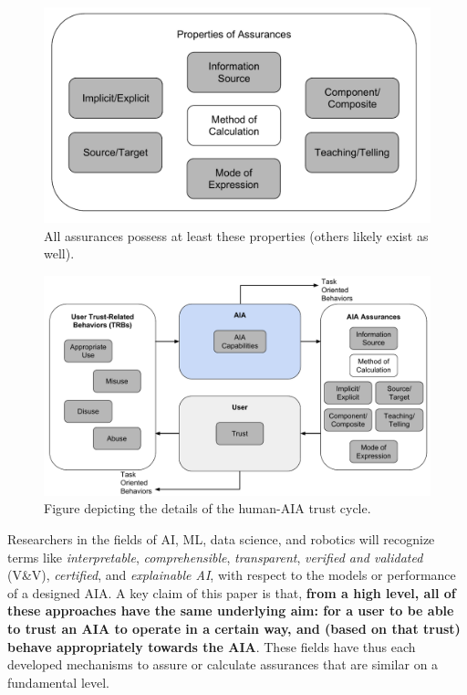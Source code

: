     \begin{figure}[htpb]
        \centering
        \includegraphics[width=0.6\linewidth]{Figures/Assurance_properties.pdf}
        \caption{All assurances possess at least these properties (others likely exist as well).}
        \label{fig:assurance_classification}
    \end{figure}
    \begin{figure}[htpb]
        \centering
        \includegraphics[width=0.6\linewidth]{Figures/RefinedTrust_one_way.pdf}
        \caption{Figure depicting the details of the human-AIA trust cycle.}
        \label{fig:refined_trust}
    \end{figure}


    Researchers in the fields of AI, ML, data science, and robotics will recognize terms like \emph{interpretable}, \emph{comprehensible}, \emph{transparent}, \emph{verified and validated} (V\&V), \emph{certified}, and \emph{explainable AI}, with respect to the models or performance of a designed AIA. A key claim of this paper is that, \textbf{from a high level, all of these approaches have the same underlying aim: for a user to be able to trust an AIA to operate in a certain way, and (based on that trust) behave appropriately towards the AIA}. These fields have thus each developed mechanisms to assure or calculate assurances that are similar on a fundamental level. 
